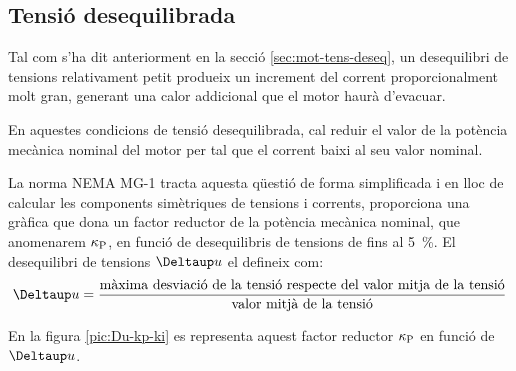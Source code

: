 \subsection{Tensió desequilibrada}\label{sec:NEMA-U-deseq}

Tal com s'ha dit anteriorment en la secció \ref{sec:mot-tens-deseq}, un desequilibri de tensions relativament petit produeix un increment del corrent proporcionalment molt gran, generant una  calor addicional que el motor haurà d'evacuar.

En aquestes condicions de tensió desequilibrada, cal reduir el valor de la potència mecànica nominal del motor per tal que el corrent baixi al seu valor nominal.

La norma NEMA MG-1 tracta aquesta qüestió de forma simplificada i en lloc de calcular les components simètriques de tensions i corrents, proporciona una gràfica que dona un factor reductor de la potència mecànica nominal, que anomenarem $\kappa_\mathrm{P}$, en funció de desequilibris de tensions de fins al \qty{5}{\%}. El desequilibri de tensions $\Deltaup u$ el defineix com:
\[
    \Deltaup u = \frac{\text{màxima desviació de la tensió respecte del valor mitja de la tensió}}{\text{valor mitjà de la tensió}}
\]

En la figura \vref{pic:Du-kp-ki} es representa aquest factor reductor $\kappa_\mathrm{P}$ en funció de $\Deltaup u$.

\begin{center}
    
    \label{pic:Du-kp-ki}
\end{center}


